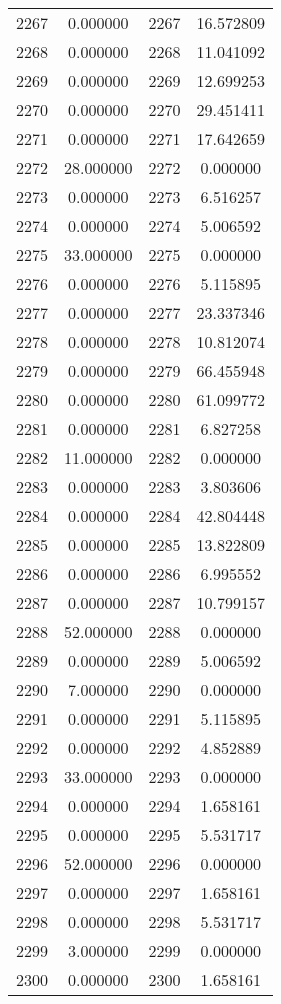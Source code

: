 \documentclass[12pt]{article}
\begin{document}
\begin{longtable}{@{}cccc@{}}
2267 & 0.000000 & 2267 & 16.572809 \\
2268 & 0.000000 & 2268 & 11.041092 \\
2269 & 0.000000 & 2269 & 12.699253 \\
2270 & 0.000000 & 2270 & 29.451411 \\
2271 & 0.000000 & 2271 & 17.642659 \\
2272 & 28.000000 & 2272 & 0.000000 \\
2273 & 0.000000 & 2273 & 6.516257 \\
2274 & 0.000000 & 2274 & 5.006592 \\
2275 & 33.000000 & 2275 & 0.000000 \\
2276 & 0.000000 & 2276 & 5.115895 \\
2277 & 0.000000 & 2277 & 23.337346 \\
2278 & 0.000000 & 2278 & 10.812074 \\
2279 & 0.000000 & 2279 & 66.455948 \\
2280 & 0.000000 & 2280 & 61.099772 \\
2281 & 0.000000 & 2281 & 6.827258 \\
2282 & 11.000000 & 2282 & 0.000000 \\
2283 & 0.000000 & 2283 & 3.803606 \\
2284 & 0.000000 & 2284 & 42.804448 \\
2285 & 0.000000 & 2285 & 13.822809 \\
2286 & 0.000000 & 2286 & 6.995552 \\
2287 & 0.000000 & 2287 & 10.799157 \\
2288 & 52.000000 & 2288 & 0.000000 \\
2289 & 0.000000 & 2289 & 5.006592 \\
2290 & 7.000000 & 2290 & 0.000000 \\
2291 & 0.000000 & 2291 & 5.115895 \\
2292 & 0.000000 & 2292 & 4.852889 \\
2293 & 33.000000 & 2293 & 0.000000 \\
2294 & 0.000000 & 2294 & 1.658161 \\
2295 & 0.000000 & 2295 & 5.531717 \\
2296 & 52.000000 & 2296 & 0.000000 \\
2297 & 0.000000 & 2297 & 1.658161 \\
2298 & 0.000000 & 2298 & 5.531717 \\
2299 & 3.000000 & 2299 & 0.000000 \\
2300 & 0.000000 & 2300 & 1.658161 \\

\end{longtable}
\end{document}
